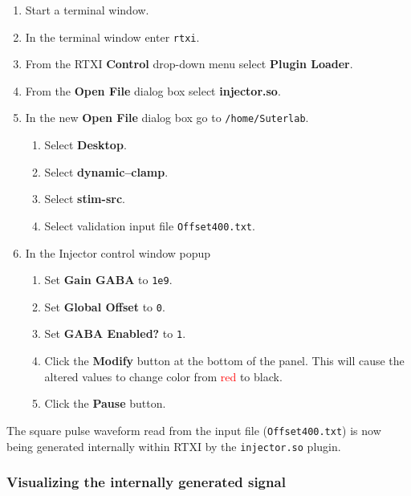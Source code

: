 \documentclass[12pt]{article}
\begin{document}
\begin{enumerate}
	\item Start a terminal window.
	\item In the terminal window enter {\tt rtxi}.
	\item From the RTXI {\bf Control} drop-down menu select {\bf Plugin Loader}.
	\item From the {\bf Open File} dialog box select {\bf injector.so}.
	\item In the new {\bf Open File} dialog box go to {\tt /home/Suterlab}.

	\begin{enumerate}
		\item Select {\bf Desktop}.
		\item Select {\bf dynamic--clamp}.
		\item Select {\bf stim-src}.
		\item Select validation input file {\tt Offset400.txt}.
	\end{enumerate}

	\item In the Injector control window popup
	\begin{enumerate}
		\item Set {\bf Gain GABA} to {\tt 1e9}.
		\item Set {\bf Global Offset} to {\tt 0}.
		\item Set {\bf GABA Enabled?} to {\tt 1}.
		\item Click the {\bf Modify} button at the bottom of the panel. This will cause the altered values 
			to change color from \textcolor{red}{red} to black.
		\item Click the {\bf Pause} button.
	\end{enumerate}
\end{enumerate}
The square pulse waveform read from the input file ({\tt Offset400.txt}) is now being generated internally within RTXI by the {\tt injector.so} plugin.

\subsubsection*{Visualizing the internally generated signal}
\end{document}
